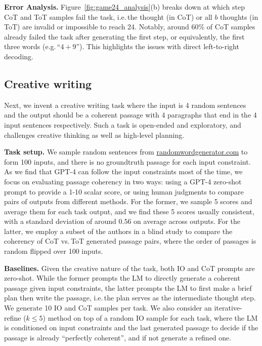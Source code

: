 \documentclass{article}
\begin{document}
\textbf{Error Analysis.} Figure~\ref{fig:game24_analysis}(b) breaks down at which step CoT and ToT samples fail the task, i.e.\,the thought (in CoT) or all $b$ thoughts (in ToT) are invalid or impossible to reach 24. Notably, around 60\% of CoT samples already failed the task after generating the first step, or equivalently, the first three words (e.g.\,``$4 + 9$''). This highlights the issues with direct left-to-right decoding.







\subsection{Creative writing}
Next, we invent a creative writing task where the input is 4 random sentences and the output should be a coherent passage with 4 paragraphs that end in the 4 input sentences respectively. 
Such a task is open-ended and exploratory, and challenges creative thinking as well as  high-level planning.

\textbf{Task setup.} We sample random sentences from \href{https://randomwordgenerator.com/sentence.php}{randomwordgenerator.com} to form 100 inputs, and there is no groundtruth passage for each input constraint. As we find that GPT-4 can follow the input constraints most of the time, we focus on evaluating passage coherency in two ways:  using a GPT-4 zero-shot prompt to provide a 1-10 scalar score, or using human judgments to compare pairs of outputs from different methods. For the former, we sample 5 scores and average them for each task output, and we find these 5 scores usually consistent, with a standard deviation of around $0.56$ on average across outputs. For the latter, we employ a subset of the authors in a blind study to compare the coherency of CoT vs.\,ToT generated passage pairs, where the order of passages is random flipped over 100 inputs. 

\textbf{Baselines.} Given the creative nature of the task, both IO and CoT prompts are zero-shot. While the former prompts the LM to directly generate a coherent passage given input constraints, the latter prompts the LM to first make a brief plan then write the passage, i.e.\,the plan serves as the intermediate thought step. We generate 10 IO and CoT samples per task. 
We also consider an iterative-refine ($k\le 5$) method on top of a random IO sample for each task, where the LM is conditioned on input constraints and the last generated passage to decide if the passage is already ``perfectly coherent'', and if not generate a refined one.
\end{document}
